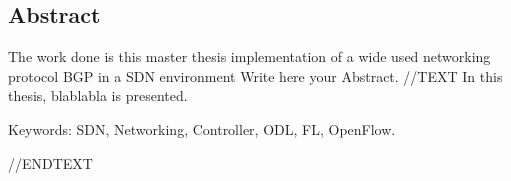 \begingroup
\let\clearpage\relax
\let\cleardoublepage\relax
\let\cleardoublepage\relax

\begin{otherlanguage}{american}
\chapter*{Abstract}


The work done is this master thesis 
implementation of a wide used networking protocol BGP in a SDN environment
Write here your Abstract.
//TEXT
In this thesis, blablabla is presented.

Keywords: SDN, Networking, Controller, ODL, FL, OpenFlow.

//ENDTEXT
\end{otherlanguage}

\vfill


\endgroup			

\vfill